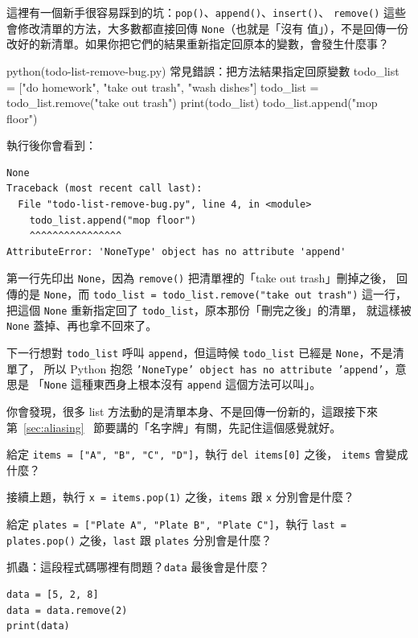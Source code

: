 這裡有一個新手很容易踩到的坑：\texttt{pop()}、\texttt{append()}、\texttt{insert()}、
\texttt{remove()} 這些會修改清單的方法，大多數都直接回傳 \texttt{None}（也就是「沒有
值」），不是回傳一份改好的新清單。如果你把它們的結果重新指定回原本的變數，會發生什麼事？

\begin{example}{python}{(todo-list-remove-bug.py) 常見錯誤：把方法結果指定回原變數}
todo_list = ["do homework", "take out trash", "wash dishes"]
todo_list = todo_list.remove("take out trash")
print(todo_list)
todo_list.append("mop floor")
\end{example}

執行後你會看到：

\begin{verbatim}
None
Traceback (most recent call last):
  File "todo-list-remove-bug.py", line 4, in <module>
    todo_list.append("mop floor")
    ^^^^^^^^^^^^^^^^
AttributeError: 'NoneType' object has no attribute 'append'
\end{verbatim}

第一行先印出 \texttt{None}，因為 \texttt{remove()} 把清單裡的「take out trash」刪掉之後，
回傳的是 \texttt{None}，而 \texttt{todo\_list = todo\_list.remove("take out trash")} 這一行，
把這個 \texttt{None} 重新指定回了 \texttt{todo\_list}，原本那份「刪完之後」的清單，
就這樣被 \texttt{None} 蓋掉、再也拿不回來了。

下一行想對 \texttt{todo\_list} 呼叫
\texttt{append}，但這時候 \texttt{todo\_list} 已經是 \texttt{None}，不是清單了，
所以 Python 抱怨 \texttt{'NoneType' object has no attribute 'append'}，意思是
「\texttt{None} 這種東西身上根本沒有 \texttt{append} 這個方法可以叫」。


你會發現，很多 list 方法動的是清單本身、不是回傳一份新的，這跟接下來第~\ref{sec:aliasing}~
節要講的「名字牌」有關，先記住這個感覺就好。

\begin{drills}[label=drills:list-remove]
\item 給定 \texttt{items = ["A", "B", "C", "D"]}，執行 \texttt{del items[0]} 之後，
\texttt{items} 會變成什麼？
\item 接續上題，執行 \texttt{x = items.pop(1)} 之後，\texttt{items} 跟 \texttt{x}
分別會是什麼？
\item 給定 \texttt{plates = ["Plate A", "Plate B", "Plate C"]}，執行
\texttt{last = plates.pop()} 之後，\texttt{last} 跟 \texttt{plates} 分別會是什麼？
\item 抓蟲：這段程式碼哪裡有問題？\texttt{data} 最後會是什麼？
\begin{verbatim}
data = [5, 2, 8]
data = data.remove(2)
print(data)
\end{verbatim}
\end{drills}

